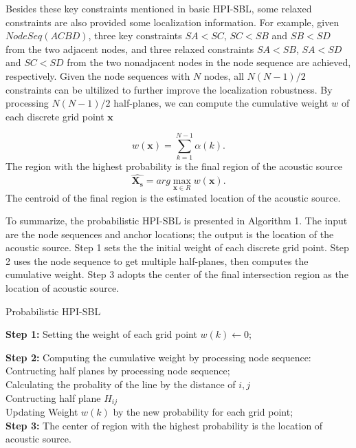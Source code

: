 Besides these key constraints mentioned in basic HPI-SBL, some relaxed constraints are also provided some localization information.
For example, given $NodeSeq (A C B D)$, three key constraints $SA<SC$, $SC<SB$ and $SB<SD$ from the two adjacent nodes,
and three relaxed constraints $SA<SB$, $SA<SD$ and $SC<SD$ from the two nonadjacent nodes in the node sequence are achieved, respectively. 
Given the node sequences with $N$ nodes, all  $N(N - 1)/2$  constraints can be ultilized to further improve the localization robustness.
By processing  $N(N - 1)/2$ half-planes, we can compute the cumulative weight $w$ of each discrete grid point $\bm{x}$

\begin{equation}\label{eq2}
w(\bm{x})=\sum\limits_{k=1} ^{N-1}\alpha(k).
\end{equation}
The region with the highest probability is the final region of the acoustic source
\begin{equation}\label{eq3}
\hat{\bm{X_s}}=arg \max_{\bm{x} \in R}w(\bm{x}).
\end{equation}
The centroid of the final region is the estimated location of the acoustic source.

To summarize, the probabilistic HPI-SBL is presented in Algorithm 1. 
The input are the node sequences and anchor locations; the output is the location of the acoustic source. 
Step 1 sets the the initial weight of each discrete grid point. 
Step 2 uses the node sequence to get multiple half-planes, then computes the cumulative weight.
Step 3 adopts the center of the final intersection region as the location of acoustic source.

\begin{algorithm}
\caption{Probabilistic HPI-SBL}

\textbf{Step 1:} Setting the weight of each grid point  $w(k) \leftarrow 0$;

\textbf{Step 2:} Computing the cumulative weight by processing node sequence: \\ 
\hspace{0.0in} Contructing half planes by processing node sequence;\\
{
{
Calculating the probality of the line by the distance of $i,j$\\
Contructing half plane $H_{ij}$\\
Updating Weight $w(k)$ by the new probability for each grid point;\\
}
}
\textbf{Step 3:} The center of region with the highest probability is the location of acoustic source.
\end{algorithm}


